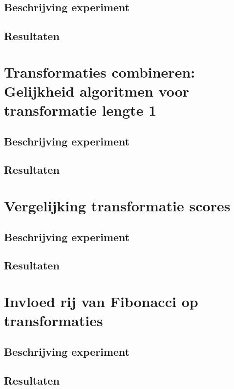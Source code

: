 \subsection{Beschrijving experiment}

\subsection{Resultaten}

\section{Transformaties combineren: Gelijkheid algoritmen voor transformatie lengte 1}
\label{experiment:4}
\subsection{Beschrijving experiment}

\subsection{Resultaten}

\section{Vergelijking transformatie scores}
\label{experiment:5}
\subsection{Beschrijving experiment}

\subsection{Resultaten}

\section{Invloed rij van Fibonacci op transformaties}
\label{experiment:3}
\subsection{Beschrijving experiment}

\subsection{Resultaten}


